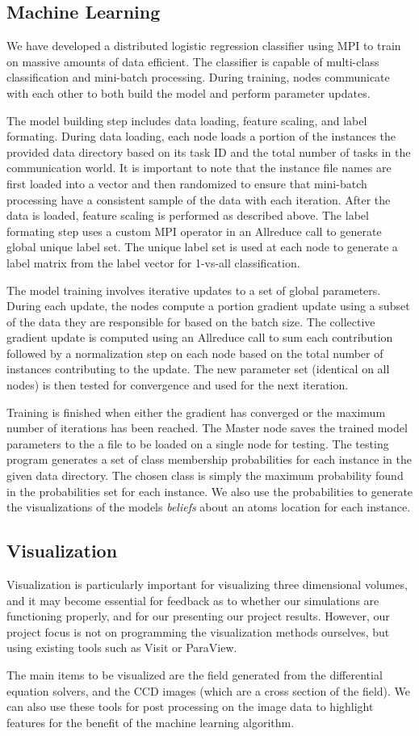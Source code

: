 \subsection{Machine Learning}
We have developed a distributed logistic regression classifier using MPI to train on massive amounts of data efficient.  The classifier is capable of multi-class classification and mini-batch processing.  During training, nodes communicate with each other to both build the model and perform parameter updates.

The model building step includes data loading, feature scaling, and label formating. During data loading, each node loads a portion of the instances the provided data directory based on its task ID and the total number of tasks in the communication world.  It is important to note that the instance file names are first loaded into a vector and then randomized to ensure that mini-batch processing have a consistent sample of the data with each iteration.  After the data is loaded, feature scaling is performed as described above.  The label formating step uses a custom MPI operator in an Allreduce call to generate global unique label set.  The unique label set is used at each node to generate a label matrix from the label vector for 1-vs-all classification.

The model training involves iterative updates to a set of global parameters.  During each update, the nodes compute a portion gradient update using a subset of the data they are responsible for based on the batch size.  The collective gradient update is computed using an Allreduce call to sum each contribution followed by a normalization step on each node based on the total number of instances contributing to the update.  The new parameter set (identical on all nodes) is then tested for convergence and used for the next iteration.

Training is finished when either the gradient has converged or the maximum number of iterations has been reached.  The Master node saves the trained model parameters to the a file to be loaded on a single node for testing.  The testing program generates a set of class membership probabilities for each instance in the given data directory.  The chosen class is simply the maximum probability found in the probabilities set for each instance.  We also use the probabilities to generate the visualizations of the models \emph{beliefs} about an atoms location for each instance.

\subsection{Visualization}
Visualization is particularly important for visualizing three dimensional volumes, and it may become essential for feedback as to whether our simulations are functioning properly, and for our presenting our project results. However, our project focus is not on programming the visualization methods ourselves, but using existing tools such as Visit or ParaView.

The main items to be visualized are the field generated from the differential equation solvers, and the CCD images (which are a cross section of the field). We can also use these tools for post processing on the image data to highlight features for the benefit of the machine learning algorithm.